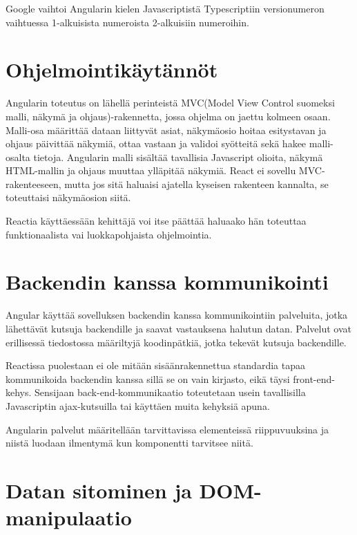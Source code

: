 \documentclass[a4paper,12pt,twoside]{article} %
\begin{document}
\vspace{4mm}\noindent
Google vaihtoi Angularin kielen Javascriptistä Typescriptiin versionumeron vaihtuessa 1-alkuisista numeroista 2-alkuisiin numeroihin.

\newpage

\section{Ohjelmointikäytännöt}
Angularin toteutus on lähellä perinteistä MVC(Model View Control suomeksi malli, näkymä ja ohjaus)-rakennetta, jossa ohjelma on jaettu kolmeen osaan. Malli-osa määrittää dataan liittyvät asiat, näkymäosio hoitaa esitystavan ja ohjaus päivittää näkymiä, ottaa vastaan ja validoi syötteitä sekä hakee malli-osalta tietoja. Angularin malli sisältää tavallisia Javascript olioita, näkymä HTML-mallin ja ohjaus muuttaa ylläpitää näkymiä. React ei sovellu MVC-rakenteeseen, mutta jos sitä haluaisi ajatella kyseisen rakenteen kannalta, se toteuttaisi näkymäosion siitä.

\vspace{4mm}\noindent
Reactia käyttäessään kehittäjä voi itse päättää haluaako hän toteuttaa funktionaalista vai luokkapohjaista ohjelmointia.

\newpage

\section{Backendin kanssa kommunikointi}

Angular käyttää sovelluksen backendin kanssa kommunikointiin palveluita, jotka lähettävät kutsuja backendille ja saavat vastauksena halutun datan. Palvelut ovat erillisessä tiedostossa määriltyjä koodinpätkiä, jotka tekevät kutsuja backendille.

\vspace{4mm}\noindent
Reactissa puolestaan ei ole mitään sisäänrakennettua standardia tapaa kommunikoida backendin kanssa sillä se on vain kirjasto, eikä täysi front-end-kehys. Sensijaan back-end-kommunikaatio toteutetaan usein tavallisilla Javascriptin ajax-kutsuilla tai käyttäen muita kehyksiä apuna.

\vspace{4mm}\noindent
Angularin palvelut määritellään tarvittavissa elementeissä riippuvuuksina ja niistä luodaan ilmentymä kun komponentti tarvitsee niitä.

\newpage

\section{Datan sitominen ja DOM-manipulaatio}
\end{document}
